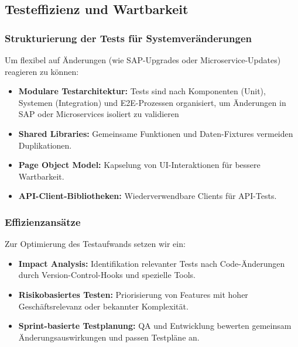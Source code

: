 \subsection{Testeffizienz und Wartbarkeit}
\subsubsection{Strukturierung der Tests für Systemveränderungen}
Um flexibel auf Änderungen (wie SAP-Upgrades oder Microservice-Updates) reagieren zu können:

\begin{itemize}
    \item \textbf{Modulare Testarchitektur:} Tests sind nach Komponenten (Unit), Systemen (Integration)
    und E2E-Prozessen organisiert, um Änderungen in SAP oder Microservices isoliert zu validieren
    \item \textbf{Shared Libraries:} Gemeinsame Funktionen und Daten-Fixtures vermeiden Duplikationen.
    \item \textbf{Page Object Model:} Kapselung von UI-Interaktionen für bessere Wartbarkeit.
    \item \textbf{API-Client-Bibliotheken:} Wiederverwendbare Clients für API-Tests.
\end{itemize}

\subsubsection{Effizienzansätze}
Zur Optimierung des Testaufwands setzen wir ein:

\begin{itemize}
    \item \textbf{Impact Analysis:} Identifikation relevanter Tests nach Code-Änderungen durch
    Version-Control-Hooks und spezielle Tools.
    \item \textbf{Risikobasiertes Testen:} Priorisierung von Features mit hoher Geschäftsrelevanz
    oder bekannter Komplexität.
    \item \textbf{Sprint-basierte Testplanung:} QA und Entwicklung bewerten gemeinsam
    Änderungsauswirkungen und passen Testpläne an.
\end{itemize}


